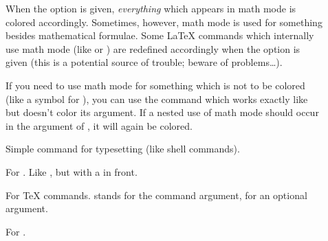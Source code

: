 \documentclass[12pt]{scrartcl}
\let\newslide=\relax
\begin{document}
  \begin{description}
  \item[]
    When the  option is given, \emph{everything} which appears in
    math mode is colored accordingly. Sometimes, however, math mode is used for something besides mathematical formulae.
    Some \LaTeX{} commands which internally use math mode (like  or ) are
    redefined accordingly when the  option is given (this is a potential source of trouble; beware of
    problems\dots).

    If you need to use math mode for something which is not to be colored (like a symbol for ), you can
    use the  command which works exactly like  but doesn't color its argument.
    If a nested use of math mode should occur in the argument of , it will again be colored.
  \end{description}

  \newslide

  \begin{description}
  \item[]
    Simple command for typesetting  (like shell commands).

  \item[]
    For . Like , but with a \macroname{} in
    front.

  \item[]
     For \TeX{} commands. 
    stands for the command argument,  for an optional argument.

  \item[]
    For .
  \end{description}

  \newslide
\end{document}

